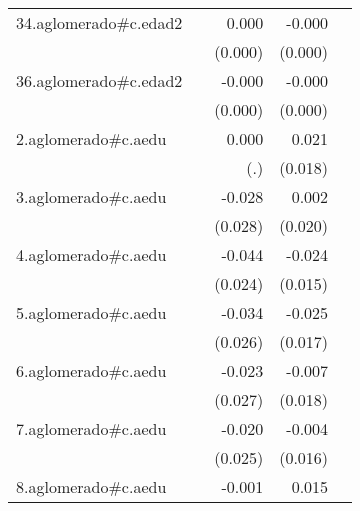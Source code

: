 {\begin{longtable}{l*{4}{D{.}{.}{-1}}}
\addlinespace
34.aglomerado#c.edad2&                     &       0.000         &      -0.000\sym{**} &                     \\
            &                     &     (0.000)         &     (0.000)         &                     \\
\addlinespace
36.aglomerado#c.edad2&                     &      -0.000         &      -0.000\sym{**} &                     \\
            &                     &     (0.000)         &     (0.000)         &                     \\
\addlinespace
2.aglomerado#c.aedu&                     &       0.000         &       0.021         &                     \\
            &                     &         (.)         &     (0.018)         &                     \\
\addlinespace
3.aglomerado#c.aedu&                     &      -0.028         &       0.002         &                     \\
            &                     &     (0.028)         &     (0.020)         &                     \\
\addlinespace
4.aglomerado#c.aedu&                     &      -0.044         &      -0.024         &                     \\
            &                     &     (0.024)         &     (0.015)         &                     \\
\addlinespace
5.aglomerado#c.aedu&                     &      -0.034         &      -0.025         &                     \\
            &                     &     (0.026)         &     (0.017)         &                     \\
\addlinespace
6.aglomerado#c.aedu&                     &      -0.023         &      -0.007         &                     \\
            &                     &     (0.027)         &     (0.018)         &                     \\
\addlinespace
7.aglomerado#c.aedu&                     &      -0.020         &      -0.004         &                     \\
            &                     &     (0.025)         &     (0.016)         &                     \\
\addlinespace
8.aglomerado#c.aedu&                     &      -0.001         &       0.015         &                     \\

\end{longtable}}
